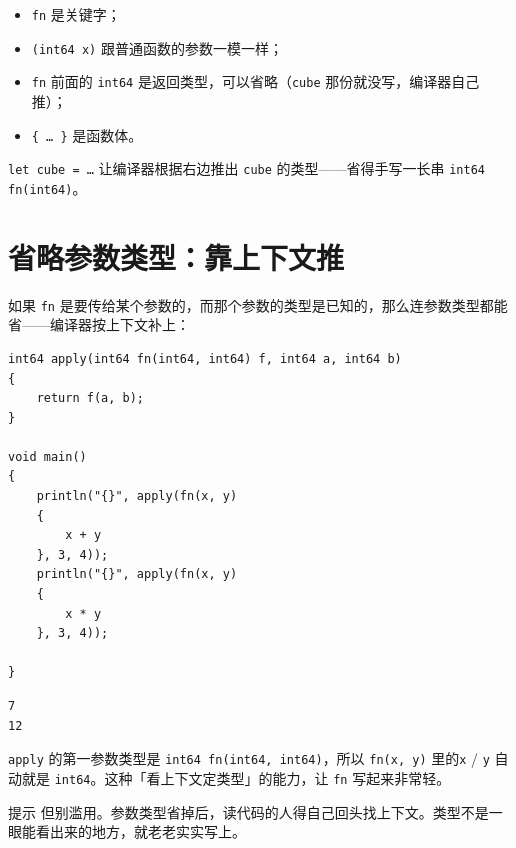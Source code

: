 \begin{itemize}

\item \texttt{fn} 是关键字；

\item \texttt{(\allowbreak{}int64 x)\allowbreak{}} 跟普通函数的参数一模一样；

\item \texttt{fn} 前面的 \texttt{int64} 是返回类型，可以省略（\texttt{cube} 那份就没写，编译器自己推）；

\item \texttt{\{ … \}} 是函数体。

\end{itemize}

\texttt{let cube =\allowbreak{} …} 让编译器根据右边推出 \texttt{cube} 的类型——省得手写一长串 \texttt{int64 fn(\allowbreak{}int64)\allowbreak{}}。

\section{省略参数类型：靠上下文推}

如果 \texttt{fn} 是要传给某个参数的，而那个参数的类型是已知的，那么连参数类型都能省——编译器按上下文补上：

\par
\medskip
\begin{lstlisting}[style=chali]
int64 apply(int64 fn(int64, int64) f, int64 a, int64 b)
{
    return f(a, b);
}

void main()
{
    println("{}", apply(fn(x, y)
    {
        x + y
    }, 3, 4));
    println("{}", apply(fn(x, y)
    {
        x * y
    }, 3, 4));

}
\end{lstlisting}
\par
\medskip

\par
\medskip
\begin{lstlisting}[style=out]
7
12
\end{lstlisting}
\par
\medskip

\texttt{apply} 的第一参数类型是 \texttt{int64 fn(\allowbreak{}int64,\allowbreak{} int64)\allowbreak{}}，所以 \texttt{fn(\allowbreak{}x,\allowbreak{} y)\allowbreak{}} 里的\texttt{x} / \texttt{y} 自动就是 \texttt{int64}。这种「看上下文定类型」的能力，让 \texttt{fn} 写起来非常轻。

\begin{tip}{提示}
但别滥用。参数类型省掉后，读代码的人得自己回头找上下文。类型不是一眼能看出来的地方，就老老实实写上。
\end{tip}

